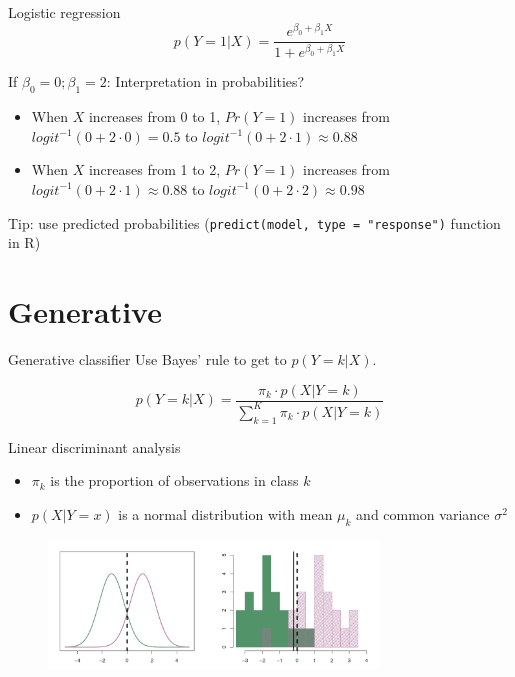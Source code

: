 \documentclass[xcolor=table,aspectratio=169]{beamer}
\begin{document}
\begin{frame}{Logistic regression}
	$$p(Y = 1 | X) = \frac{e^{\beta_0 + \beta_1 X}}{1 + e^{\beta_0 + \beta_1 X}}$$
	
	If  $\beta_0 = 0; \beta_1 = 2$:	Interpretation in probabilities?\\
	
	\begin{itemize}
		\item When $X$ increases from 0 to 1, $Pr(Y = 1)$ increases from  $logit^{-1}(0 + 2 \cdot 0) = 0.5$ to $logit^{-1}(0 + 2 \cdot 1) \approx 0.88$\\
		\item When $X$ increases from 1 to 2, $Pr(Y = 1)$ increases from  $logit^{-1}(0 + 2 \cdot 1) \approx 0.88$ to $logit^{-1}(0 + 2 \cdot 2) \approx 0.98$\\
	\end{itemize}	
	
	Tip: use predicted probabilities (\texttt{predict(model, type = "response")} function in R)
\end{frame}

\section{Generative}

\begin{frame}{Generative classifier}
	Use Bayes' rule to get to $p(Y = k | X)$.
	
	
	$$p(Y = k | X) = \frac{\pi_k \cdot p(X | Y = k)}{\sum_{k = 1}^K \pi_k \cdot p(X | Y = k)}$$

\end{frame}

\begin{frame}{Linear discriminant analysis}
	\begin{itemize}
		\item $\pi_k$ is the proportion of observations in class $k$
		\item $p(X | Y = x)$ is a normal distribution with mean $\mu_k$ and common variance $\sigma^2$
	\end{itemize}
	
	\begin{figure}
		\includegraphics[width=0.78\textwidth]{pics/lda.png}
	\end{figure}
\end{frame}
\end{document}

